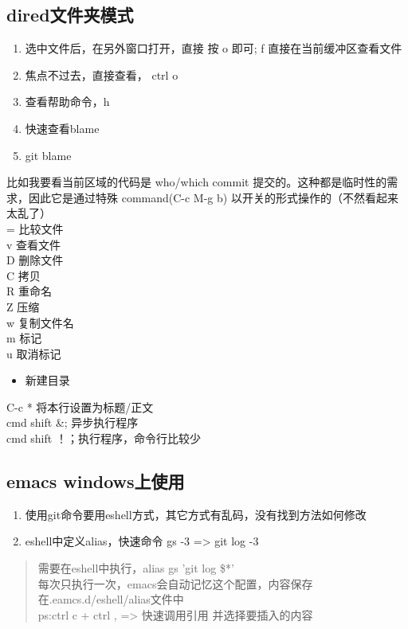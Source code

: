 \documentclass[11pt]{article}
\begin{document}
\subsection{dired文件夹模式}
\label{sec:org7d480d4}
\begin{enumerate}
\item 选中文件后，在另外窗口打开，直接 按 o 即可; f 直接在当前缓冲区查看文件\\
\item 焦点不过去，直接查看， ctrl o\\
\item 查看帮助命令，h\\
\item 快速查看blame\\
\item git blame\\
\end{enumerate}
比如我要看当前区域的代码是 who/which commit 提交的。这种都是临时性的需求，因此它是通过特殊 command(C-c M-g b) 以开关的形式操作的（不然看起来太乱了）\\

= 比较文件\\
v 查看文件\\
D 删除文件\\
C 拷贝\\
R 重命名\\
Z 压缩\\
w 复制文件名\\
m 标记\\
u 取消标记\\
\begin{itemize}
\item 新建目录\\
\end{itemize}


C-c *	将本行设置为标题/正文\\

cmd shift \&; 异步执行程序\\
cmd shift ！；执行程序，命令行比较少\\

\subsection{emacs windows上使用}
\label{sec:org56ed6b3}
\begin{enumerate}
\item 使用git命令要用eshell方式，其它方式有乱码，没有找到方法如何修改\\
\item eshell中定义alias，快速命令 gs -3 => git log -3\\
\end{enumerate}
\begin{quote}
需要在eshell中执行，alias gs 'git log \$*'\\
每次只执行一次，emacs会自动记忆这个配置，内容保存在.eamcs.d/eshell/alias文件中\\

ps:ctrl c + ctrl , => 快速调用引用 并选择要插入的内容\\
\end{quote}
\end{document}
